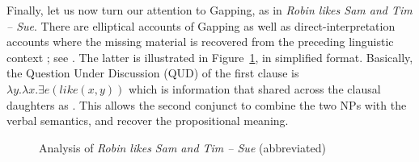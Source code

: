 \documentclass[output=paper]{langsci/langscibook}
\begin{document}
Finally, let us now turn our attention to Gapping, as in 
\emph{Robin likes Sam and Tim -- Sue}.
There are elliptical accounts of Gapping  \citep{chaves06} as well as direct-interpretation accounts where the missing material is recovered from the preceding linguistic context  \citep{mouret, Mouret:06,Abeille:Blbie:Mouret:14,sangheepark}; see . The latter is illustrated in Figure~\ref{gfig}, in simplified format. Basically, the Question Under Discussion (QUD) \citep{roberts96} of the first clause is $\lambda y.\lambda x. \exists e(like(x,y))$ which is information that shared across the clausal daughters as .
This allows the second conjunct to combine the two NPs with the verbal semantics, and recover the propositional meaning.


\begin{figure}
\oneline{%
\begin{forest}
[S\ms{
      qud     & \ibox{1}\\
      content & \menge{ $\exists e'(like(robin,sam)) \wedge \exists e(like(tim,sue))$ }\\
     } 
 [S\ms{  qud & \ibox{1}\\
         content & \menge{ \ibox{0} $\exists e'(like(robin,sam))$ } %
      } ]
 [S\ms{ qud & \ibox{1}\\
          content & \menge{ \ibox{0} $\wedge \exists e(like(tim,sue))$ }
        }
 [Conj [and]]
 [S\ms{ qud & \ibox{1} \menge{ $\lambda y. \lambda x. \exists e(like(x,y))$ }\\
        content & \menge{ $\exists e(like(t,s))$ } } 
   [NP\ms{ content & \menge{ $tim$ }}]
   [NP\ms{ content & \menge{ $sue$ }}] ]
]]
\end{forest}
}
\caption{Analysis of \emph{Robin likes Sam and Tim -- Sue} (abbreviated)}\label{gfig}
\end{figure}
\end{document}
